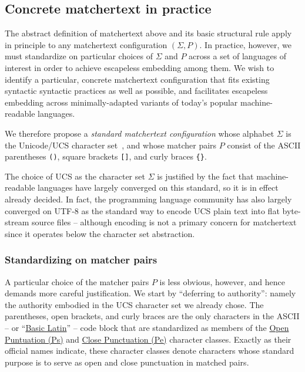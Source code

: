\subsection{Concrete matchertext in practice}
\label{sec:design:concrete}

The abstract definition of matchertext above
and its basic structural rule apply in principle
to any matchertext configuration $(\Sigma,P)$.
In practice, however,
we must standardize on particular choices of $\Sigma$ and $P$
across a set of languages of interest
in order to achieve escapeless embedding among them.
We wish to identify a particular, concrete matchertext configuration
that fits existing syntactic syntactic practices as well as possible,
and facilitates escapeless embedding across 
minimally-adapted variants of today's popular machine-readable languages.

We therefore propose a \emph{standard matchertext configuration}
whose alphabet $\Sigma$ is the Unicode/UCS character set~\cite{iso10646ucs},
and whose matcher pairs $P$ consist of
the ASCII parentheses \verb|()|,
square brackets \verb|[]|,
and curly braces \verb|{}|.

The choice of UCS as the character set $\Sigma$
is justified by the fact that machine-readable languages
have largely converged on this standard,
so it is in effect already decided.
In fact, the programming language community has also largely converged
on UTF-8 as the standard way to encode UCS plain text
into flat byte-stream source files --
although encoding is not a primary concern for matchertext
since it operates below the character set abstraction.

\subsubsection{Standardizing on matcher pairs}

A particular choice of the matcher pairs $P$ is less obvious, however,
and hence demands more careful justification.
We start by ``deferring to authority'':
namely the authority embodied in
the UCS character set we already chose.
The parentheses, open brackets, and curly braces
are the only characters in the ASCII --
or ``\href{https://www.compart.com/en/unicode/block/U+0000}{Basic Latin}'' -- 
code block that are standardized as members of the
\href{https://www.compart.com/en/unicode/category/Ps}{Open Puntuation (Ps)}
and 
\href{https://www.compart.com/en/unicode/category/Pe}{Close Punctuation (Pe)}
character classes.
Exactly as their official names indicate,
these character classes denote characters whose standard purpose
is to serve as open and close punctuation in matched pairs.


